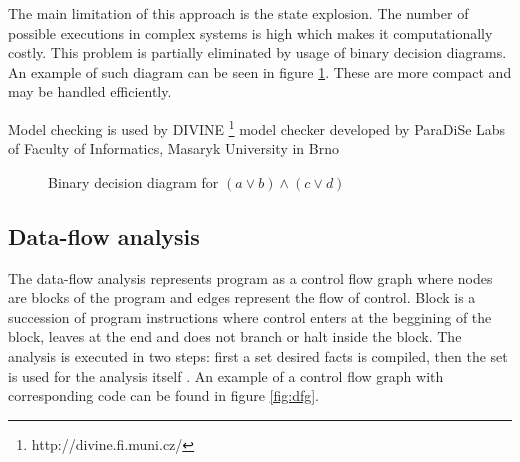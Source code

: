 \documentclass[12pt,final,oneside]{fithesis2}
\theoremstyle{definition}
\begin{document}
The main limitation of this approach is the state explosion. The number
of possible executions in complex systems is high which makes it
computationally costly. This problem is partially eliminated by usage
of binary decision diagrams. An example of such diagram can be seen in
figure \ref{fig:bdd}. These are more compact and may be handled
efficiently.

Model checking is used by DIVINE \footnote{http://divine.fi.muni.cz/} model
checker developed by ParaDiSe Labs of Faculty of Informatics, Masaryk University
in Brno

\begin{figure}[h]
\centering
{}
\caption{Binary decision diagram for $(a \lor b) \land (c \lor d)$}
\label{fig:bdd}
\end{figure}


\subsection{Data-flow analysis}

The data-flow analysis represents program as a control flow graph where
nodes are blocks of the program and edges represent the flow of
control. Block is a succession of program instructions where control
enters at the beggining of the block, leaves at the end and does not
branch or halt inside the block. The analysis is executed in two steps:
first a set desired facts is compiled, then the set is used for the
analysis itself \cite{Wogerer05-1}. An example of a control flow graph
with corresponding code can be found in figure \ref{fig:dfg}.
\end{document}
